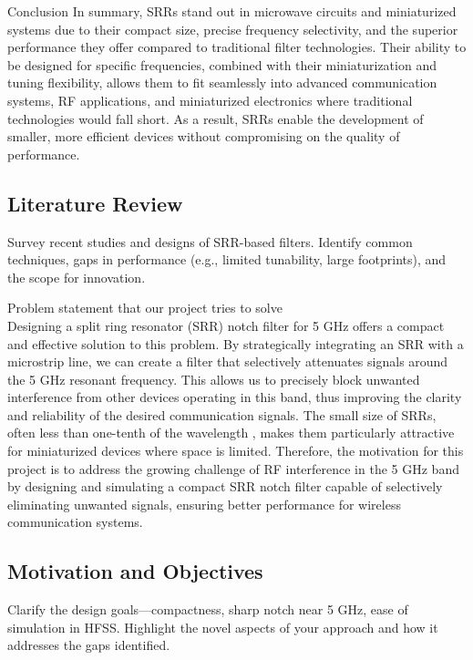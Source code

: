 \documentclass[conference]{IEEEtran}
\begin{document}
Conclusion
In summary, SRRs stand out in microwave circuits and miniaturized systems due to their compact size, precise frequency selectivity, and the superior performance they offer compared to traditional filter technologies. Their ability to be designed for specific frequencies, combined with their miniaturization and tuning flexibility, allows them to fit seamlessly into advanced communication systems, RF applications, and miniaturized electronics where traditional technologies would fall short. As a result, SRRs enable the development of smaller, more efficient devices without compromising on the quality of performance.



\subsection{Literature Review}
Survey recent studies and designs of SRR-based filters. Identify common techniques, gaps in performance (e.g., limited tunability, large footprints), and the scope for innovation.


Problem statement that our project tries to solve\\ 
Designing a split ring resonator (SRR) notch filter for 5 GHz offers a compact and effective solution to this problem. By strategically integrating an SRR with a microstrip line, we can create a filter that selectively attenuates signals around the 5 GHz resonant frequency. This allows us to precisely block unwanted interference from other devices operating in this band, thus improving the clarity and reliability of the desired communication signals. The small size of SRRs, often less than one-tenth of the wavelength , makes them particularly attractive for miniaturized devices where space is limited. Therefore, the motivation for this project is to address the growing challenge of RF interference in the 5 GHz band by designing and simulating a compact SRR notch filter capable of selectively eliminating unwanted signals, ensuring better performance for wireless communication systems.



\subsection{Motivation and Objectives}
Clarify the design goals—compactness, sharp notch near 5 GHz, ease of simulation in HFSS. Highlight the novel aspects of your approach and how it addresses the gaps identified.
\end{document}

